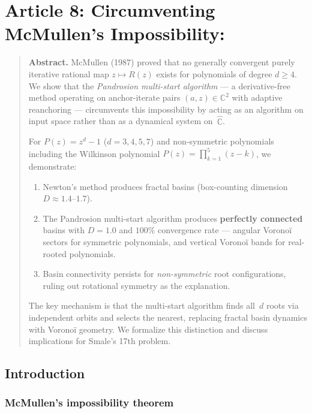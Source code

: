 \documentclass[10pt,a4paper,oneside]{book}
\theoremstyle{definition}
\theoremstyle{remark}
\newenvironment{abstract}{\begin{quote}\small\textbf{Abstract.}}{\end{quote}}
\begin{document}
\chapter{Article 8: Circumventing McMullen's Impossibility:}
\graphicspath{{../figures/}}

\begin{abstract}
McMullen (1987) proved that no generally convergent purely iterative rational map $z \mapsto R(z)$ exists for polynomials of degree $d \geq 4$.  
We show that the \emph{Pandrosion multi-start algorithm} --- a derivative-free method operating on anchor-iterate pairs $(a, z) \in \mathbb{C}^2$ with adaptive reanchoring --- circumvents this impossibility by acting as an algorithm on input space rather than as a dynamical system on~$\hat{\mathbb{C}}$.

For $P(z) = z^d - 1$ ($d = 3, 4, 5, 7$) and non-symmetric polynomials including the Wilkinson polynomial $P(z) = \prod_{k=1}^5 (z-k)$, we demonstrate:
\begin{enumerate}[nosep]
\item Newton's method produces fractal basins (box-counting dimension $D \approx 1.4$--$1.7$).
\item The Pandrosion multi-start algorithm produces \textbf{perfectly connected} basins with $D = 1.0$ and $100\%$ convergence rate --- angular Vorono\"i sectors for symmetric polynomials, and vertical Vorono\"i bands for real-rooted polynomials.
\item Basin connectivity persists for \emph{non-symmetric} root configurations, ruling out rotational symmetry as the explanation.
\end{enumerate}
The key mechanism is that the multi-start algorithm finds all~$d$ roots via independent orbits and selects the nearest, replacing fractal basin dynamics with Vorono\"i geometry.  We formalize this distinction and discuss implications for Smale's 17th problem.
\end{abstract}

\section{Introduction}

\subsection{McMullen's impossibility theorem}
\end{document}
